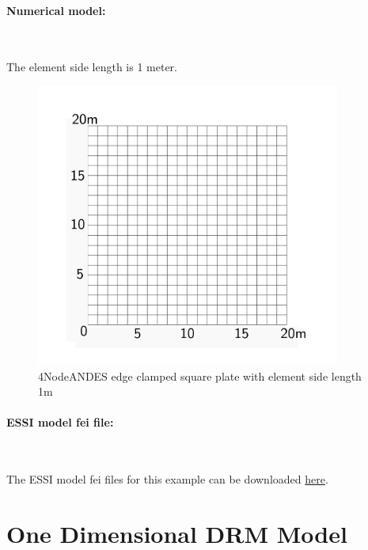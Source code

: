 \documentclass[fleqn,11pt]{article}
\begin{document}
\newpage
\paragraph{Numerical model:} ~

The element side length is 1 meter. 


\begin{figure}[H]
  \centering
  \includegraphics[width=10cm]{../Figure-files/square_plate4_2.pdf}
  \caption{4NodeANDES edge clamped square plate with element side length 1m }
  \label{fig 4NodeANDES edges clamped square plate with element side length 1m }
\end{figure}


\paragraph{ESSI model fei file: } ~




The ESSI model fei files for this example can be downloaded \href{https://github.com/yuan-energy/Real-ESSI-Examples/blob/master/model_fei_file/ANDESshell_square_plate/ANDESshell_square_plate.tgz?raw=true}{here}.




















\newpage
\section{One Dimensional DRM Model}
\end{document}
